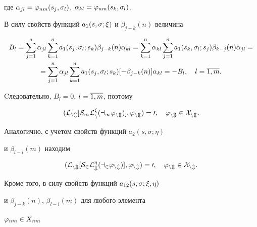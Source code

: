где $\alpha_{jl} = \varphi_{nm}(s_j,\sigma_l)$, $\alpha_{kl} = \varphi_{nm}(s_k,\sigma_l)$.


В силу свойств функций $a_1(s,\sigma;\xi)$  и $\beta_{j-k}(n)$ величина


\begin{gather*}


B_l = \sum_{j=1}^n \alpha_{jl} \sum_{k=1}^na_1(s_j,\si_l;s_k)


\beta_{j-k}(n)\alpha_{kl} = \sum_{k=1}^n\alpha_{kl}


\sum_{j=1}^n a_1(s_k,\si_l;s_j)\beta_{k-j}(n)\alpha_{jl} = \\


%


=\sum_{j=1}^n \alpha_{jl}\sum_{k=1}^n a_1(s_j,\si_l;s_k)


[-\beta_{j-k}(n)]\alpha_{kl} = -B_l,\quad l=\ol{1,m}.


\end{gather*}


Cледовательно, $B_l=0$, $l=\overline{1,m}$, поэтому


\begin{equation}


(\rL_{nm}[S_1\rL_n^\xi(a_1\vp_{nm})],\vp_{nm}) = 0, \quad \vp_{nm}\in X_{nm}.


\end{equation}


Аналогично, с учетом свойств функций $a_2(s,\sigma;\eta)$ 


и $\beta_{l-i}(m)$ находим 


\begin{equation}


(\rL_{nm}[S_2\rL_m^\eta(a_2\vp_{nm})],\vp_{nm})=0, \quad \vp_{nm}\in X_{nm}.


\end{equation}


Кроме того, в силу свойств функций $a_{12}(s,\sigma;\xi,\eta)$


и $\beta_{j-k}(n)$, $\beta_{l-i}(m)$ для любого элемента\linebreak


$\varphi_{nm}\in X_{nm}$


